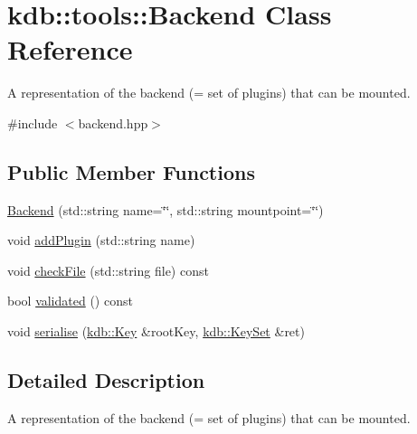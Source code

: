 \hypertarget{classkdb_1_1tools_1_1Backend}{\section{kdb\-:\-:tools\-:\-:Backend Class Reference}
\label{classkdb_1_1tools_1_1Backend}
}


A representation of the backend (= set of plugins) that can be mounted.  




{\ttfamily \#include $<$backend.\-hpp$>$}

\subsection*{Public Member Functions}
\begin{DoxyCompactItemize}
\item 
\hyperlink{classkdb_1_1tools_1_1Backend_ae1e876a38d1e9ab456830edc0a31350e}{Backend} (std\-::string name=\char`\"{}\char`\"{}, std\-::string mountpoint=\char`\"{}\char`\"{})
\item 
void \hyperlink{classkdb_1_1tools_1_1Backend_ac8570864ee3fcff56316f435a2f928ee}{add\-Plugin} (std\-::string name)
\item 
void \hyperlink{classkdb_1_1tools_1_1Backend_a26a0899dac268e6d8ced1d7003cd694c}{check\-File} (std\-::string file) const 
\item 
bool \hyperlink{classkdb_1_1tools_1_1Backend_ad2b145e2ac9a4f276714d0d982583e03}{validated} () const 
\item 
void \hyperlink{classkdb_1_1tools_1_1Backend_acb6f43d0d7eaf40570c37564aa0f3c53}{serialise} (\hyperlink{classkdb_1_1Key}{kdb\-::\-Key} \&root\-Key, \hyperlink{classkdb_1_1KeySet}{kdb\-::\-Key\-Set} \&ret)
\end{DoxyCompactItemize}


\subsection{Detailed Description}
A representation of the backend (= set of plugins) that can be mounted. 

